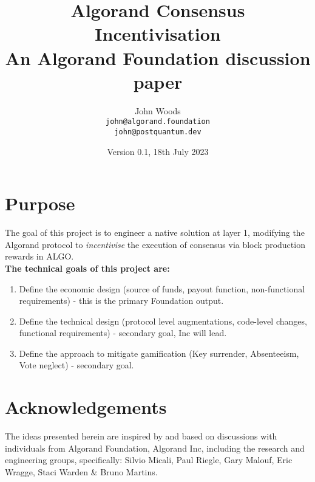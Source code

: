 \documentclass[11pt,a4paper]{article}
\begin{document}
\title {Algorand Consensus Incentivisation \\
       {\large \sc An Algorand Foundation discussion paper}}
\date  {Version 0.1, 18th July 2023}
\author{John Woods         \\ {\small \texttt{john@algorand.foundation}} \\
                              {\small \texttt{john@postquantum.dev}} \\
}

\maketitle

\section{Purpose}
The goal of this project is to engineer a native solution at layer 1, modifying the Algorand protocol to 
\emph{incentivise} the execution of consensus via block production rewards in ALGO. \\

\textbf{The technical goals of this project are:}

\begin{enumerate}
    \item Define the economic design (source of funds, payout function, non-functional requirements) - this is the 
          primary Foundation output.
    \item Define the technical design (protocol level augmentations, code-level changes, functional requirements) 
          - secondary goal, Inc will lead.
    \item Define the approach to mitigate gamification (Key surrender, Absenteeism, Vote neglect) - secondary goal.
\end{enumerate}

\pagebreak

\tableofcontents

\pagebreak

\section{Acknowledgements}
The ideas presented herein are inspired by and based on discussions with individuals from Algorand Foundation, 
Algorand Inc, including the research and engineering groups, specifically: Silvio Micali, Paul Riegle, Gary Malouf, 
Eric Wragge, Staci Warden \& Bruno Martins.
\end{document}
